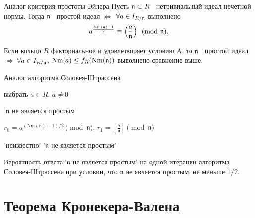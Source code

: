 \documentclass[8pt, xcolor=x11names]{beamer}
\begin{document}
\begin{frame}
    \begin{block}{Аналог критерия простоты Эйлера}
        Пусть $\mathfrak{n} \subset R$ \textendash\ нетривиальный идеал нечетной нормы.
        Тогда $\mathfrak{n}$ \textendash\ простой идеал $\Leftrightarrow$ $\forall a \in I_{R/\mathfrak{n}}$ выполнено
        \begin{equation*}\label{eq:euler}
            a^{\frac{\textrm{Nm}(\mathfrak{n}) - 1}{2}} \equiv \left(\frac{a}{\mathfrak{n}}\right) \pmod{\mathfrak{n}}.
        \end{equation*}
    
        Если кольцо $R$ факториальное и удовлетворяет условию A, то $\mathfrak{n}$ \textendash\ простой идеал $\Leftrightarrow$ $\forall a \in I_{R/\mathfrak{n}}$, $\textrm{Nm}(a) \le f_R(\textrm{Nm}(\mathfrak{n}))$ выполнено сравнение выше.
    \end{block}

    \begin{block}{Аналог алгоритма Соловея-Штрассена}
        \begin{algorithmic}[1]
            \State выбрать $a \in R$, $a \neq 0$

                \State\Return '$\mathfrak{n}$ не является простым'
            \EndIf

            \State $r_0 = a^{(\textrm{Nm}(\mathfrak{n}) - 1) / 2} \pmod{\mathfrak{n}}$, $r_1 = \left[\frac{a}{\mathfrak{n}}\right] \pmod{\mathfrak{n}}$
    		
    		    \State\Return 'неизвестно'
    		\Else
    		    \State\Return '$\mathfrak{n}$ не является простым'
    		\EndIf
        \end{algorithmic}

        Вероятность ответа '$\mathfrak{n}$ не является простым' на одной итерации алгоритма Соловея-Штрассена при условии, что $\mathfrak{n}$ не является простым, не меньше $1/2$.
    \end{block}
\end{frame}

\section{Теорема Кронекера-Валена}
\end{document}
